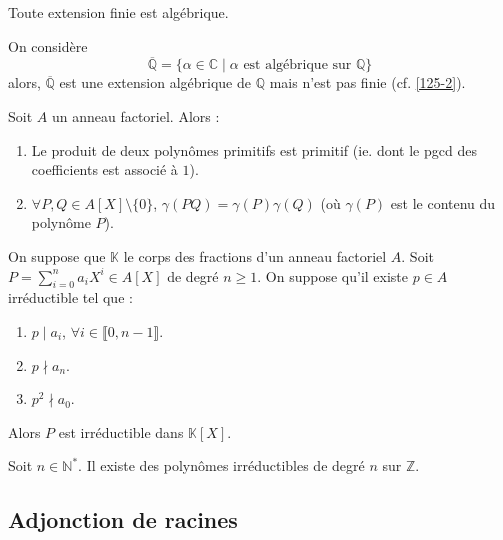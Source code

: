 	\begin{proposition}
		Toute extension finie est algébrique.
	\end{proposition}

	\begin{cexample}
		\label{125-1}
		On considère
		\[ \overline{\mathbb{Q}} = \{ \alpha \in \mathbb{C} \mid \alpha \text{ est algébrique sur } \mathbb{Q} \} \]
		alors, $\overline{\mathbb{Q}}$ est une extension algébrique de $\mathbb{Q}$ mais n'est pas finie (cf. \cref{125-2}).
	\end{cexample}


	\begin{lemma}[Gauss]
		Soit $A$ un anneau factoriel. Alors :
		\begin{enumerate}[label=(\roman*)]
			\item Le produit de deux polynômes primitifs est primitif (ie. dont le pgcd des coefficients est associé à $1$).
			\item $\forall P, Q \in A[X] \setminus \{ 0 \}$, $\gamma(PQ) = \gamma(P) \gamma(Q)$ (où $\gamma(P)$ est le contenu du polynôme $P$).
		\end{enumerate}
	\end{lemma}


	\begin{theorem}
		On suppose que $\mathbb{K}$ le corps des fractions d'un anneau factoriel $A$. Soit $P = \sum_{i=0}^n a_i X^i \in A[X]$ de degré $n \geq 1$. On suppose qu'il existe $p \in A$ irréductible tel que :
		\begin{enumerate}[label=(\roman*)]
			\item $p \mid a_i$, $\forall i \in \llbracket 0, n-1 \rrbracket$.
			\item $p \nmid a_n$.
			\item $p^2 \nmid a_0$.
		\end{enumerate}
		Alors $P$ est irréductible dans $\mathbb{K}[X]$.
	\end{theorem}


	\begin{application}
		\label{125-2}
		Soit $n \in \mathbb{N}^*$. Il existe des polynômes irréductibles de degré $n$ sur $\mathbb{Z}$.
	\end{application}

	\subsection{Adjonction de racines}

